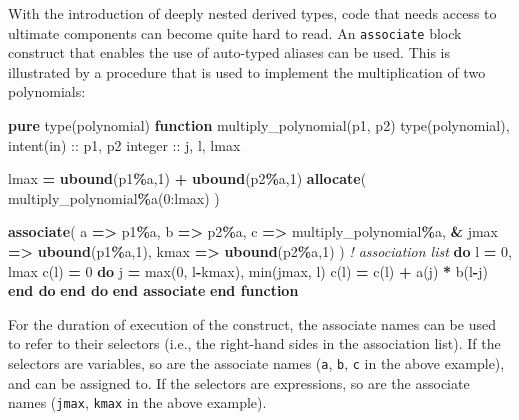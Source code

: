 \documentclass[
  paper=a4,
  ,captions=tableheading
]{scrartcl}
\newenvironment{Shaded}{\begin{snugshade}}{\end{snugshade}}
\newcommand{\BuiltInTok}[1]{#1}
\newcommand{\CommentTok}[1]{\textcolor[rgb]{0.56,0.35,0.01}{\textit{#1}}}
\newcommand{\DataTypeTok}[1]{\textcolor[rgb]{0.13,0.29,0.53}{#1}}
\newcommand{\DecValTok}[1]{\textcolor[rgb]{0.00,0.00,0.81}{#1}}
\newcommand{\FunctionTok}[1]{\textcolor[rgb]{0.13,0.29,0.53}{\textbf{#1}}}
\newcommand{\KeywordTok}[1]{\textcolor[rgb]{0.13,0.29,0.53}{\textbf{#1}}}
\newcommand{\NormalTok}[1]{#1}
\newcommand{\OperatorTok}[1]{\textcolor[rgb]{0.81,0.36,0.00}{\textbf{#1}}}
\begin{document}
With the introduction of deeply nested derived types, code that needs
access to ultimate components can become quite hard to read. An
\texttt{associate} block construct that enables the use of auto-typed
aliases can be used. This is illustrated by a procedure that is used to
implement the multiplication of two polynomials:

\begin{Shaded}
\begin{Highlighting}[]
\KeywordTok{pure} \DataTypeTok{type(polynomial)} \KeywordTok{function}\NormalTok{ multiply\_polynomial(p1, p2)}
  \DataTypeTok{type(polynomial)}\NormalTok{, }\DataTypeTok{intent(in)} \DataTypeTok{::}\NormalTok{ p1, p2}
  \DataTypeTok{integer} \DataTypeTok{::}\NormalTok{ j, l, lmax}

\NormalTok{  lmax }\KeywordTok{=} \FunctionTok{ubound}\NormalTok{(p1}\OperatorTok{\%}\NormalTok{a,}\DecValTok{1}\NormalTok{) }\KeywordTok{+} \FunctionTok{ubound}\NormalTok{(p2}\OperatorTok{\%}\NormalTok{a,}\DecValTok{1}\NormalTok{)}
  \KeywordTok{allocate}\NormalTok{( multiply\_polynomial}\OperatorTok{\%}\NormalTok{a(}\DecValTok{0}\NormalTok{:lmax) )}

  \KeywordTok{associate}\NormalTok{( a }\KeywordTok{=}\OperatorTok{\textgreater{}}\NormalTok{ p1}\OperatorTok{\%}\NormalTok{a, b }\KeywordTok{=}\OperatorTok{\textgreater{}}\NormalTok{ p2}\OperatorTok{\%}\NormalTok{a, c }\KeywordTok{=}\OperatorTok{\textgreater{}}\NormalTok{ multiply\_polynomial}\OperatorTok{\%}\NormalTok{a, }\KeywordTok{\&}
\NormalTok{    jmax }\KeywordTok{=}\OperatorTok{\textgreater{}} \FunctionTok{ubound}\NormalTok{(p1}\OperatorTok{\%}\NormalTok{a,}\DecValTok{1}\NormalTok{), kmax }\KeywordTok{=}\OperatorTok{\textgreater{}} \FunctionTok{ubound}\NormalTok{(p2}\OperatorTok{\%}\NormalTok{a,}\DecValTok{1}\NormalTok{) )  }\CommentTok{! association list}
    \KeywordTok{do}\NormalTok{ l }\KeywordTok{=} \DecValTok{0}\NormalTok{, lmax}
\NormalTok{      c(l) }\KeywordTok{=} \DecValTok{0}
      \KeywordTok{do}\NormalTok{ j }\KeywordTok{=} \BuiltInTok{max}\NormalTok{(}\DecValTok{0}\NormalTok{, l}\KeywordTok{{-}}\NormalTok{kmax), }\BuiltInTok{min}\NormalTok{(jmax, l)}
\NormalTok{        c(l) }\KeywordTok{=}\NormalTok{ c(l) }\KeywordTok{+}\NormalTok{ a(j) }\KeywordTok{*}\NormalTok{ b(l}\KeywordTok{{-}}\NormalTok{j)}
      \KeywordTok{end do}
    \KeywordTok{end do}
  \KeywordTok{end associate}
\KeywordTok{end function}
\end{Highlighting}
\end{Shaded}

For the duration of execution of the construct, the associate names can
be used to refer to their selectors (i.e., the right-hand sides in the
association list). If the selectors are variables, so are the associate
names (\texttt{a}, \texttt{b}, \texttt{c} in the above example), and can
be assigned to. If the selectors are expressions, so are the associate
names (\texttt{jmax}, \texttt{kmax} in the above example).
\end{document}
